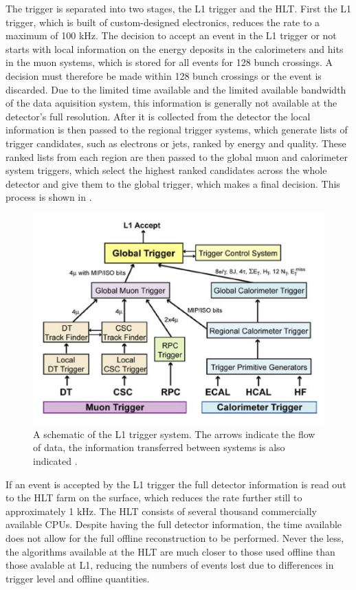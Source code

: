 The trigger is separated into two stages, the \ac{L1} trigger and the \ac{HLT}. First the \ac{L1} trigger, which is built of custom-designed electronics, reduces the rate to a maximum of 100 kHz. The decision to accept an event in the \ac{L1} trigger or not starts with local information on the energy deposits in the calorimeters and hits in the muon systems, which is stored for all events for 128 bunch crossings. A decision must therefore be made within 128 bunch crossings or the event is discarded. Due to the limited time available and the limited available bandwidth of the data aquisition system, this information is generally not available at the detector's full resolution. After it is collected from the detector the local information is then passed to the regional trigger systems, which generate lists of trigger candidates, such as electrons or jets, ranked by energy and quality. These ranked lists from each region are then passed to the global muon and calorimeter system triggers, which select the highest ranked candidates across the whole detector and give them to the global trigger, which makes a final decision. This process is shown in .

\begin{figure}
  \includegraphics[width=1.2\largefigwidth]{plots/detector/L1T_Layout.png}
  \caption{A schematic of the \ac{L1} trigger system. The arrows indicate the flow of data, the information transferred between systems is also indicated \cite{Chatrchyan:2008aa}.}
  \label{fig:l1layout}
\end{figure}

If an event is accepted by the \ac{L1} trigger the full detector information is read out to the \ac{HLT} farm on the surface, which reduces the rate further still to approximately 1 kHz.  The \ac{HLT} consists of several thousand commercially available CPUs. Despite having the full detector information, the time available does not allow for the full offline reconstruction to be performed. Never the less, the algorithms available at the \ac{HLT} are much closer to those used offline than those avalable at \ac{L1}, reducing the numbers of events lost due to differences in trigger level and offline quantities.

